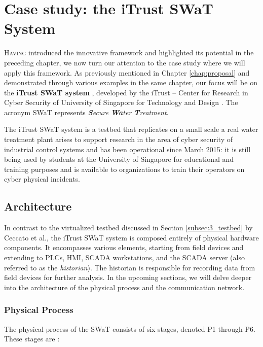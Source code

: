 \chapter{Case study: the iTrust SWaT System}
\label{casestudy}

\linenumbers
\lettrine[lines=2]{H}{aving} introduced the innovative framework and highlighted its potential in the preceding chapter, we now turn our attention to the case study where we will apply this framework. As previously mentioned in Chapter \ref{chap:proposal} and demonstrated through various examples in the same chapter, our focus will be on the \textbf{iTrust SWaT system} \cite{swat_home}, developed by the iTrust -- Center for Research in Cyber Security of University of Singapore for Technology and Design \cite{itrust_site}. The acronym SWaT represents \textit{\textbf{S}ecure \textbf{Wa}ter \textbf{T}reatment}.

\bigskip
The iTrust SWaT system is a testbed that replicates on a small scale a real water treatment plant arises to support research in the area of cyber security of industrial control systems and has been operational since March 2015: it is still being used by students at the University of Singapore for educational and training purposes and is available to organizations to train their operators on cyber physical incidents.

\section{Architecture}
\label{sec:5_swat_architecture}
In contrast to the virtualized testbed discussed in Section \ref{subsec:3_testbed} by Ceccato et al., the iTrust SWaT system is composed entirely of physical hardware components. It encompasses various elements, starting from field devices and extending to PLCs, HMI, SCADA workstations, and the SCADA server (also referred to as the \textit{historian}). The historian is responsible for recording data from field devices for further analysis. In the upcoming sections, we will delve deeper into the architecture of the physical process and the communication network.

\subsection{Physical Process} 
\label{subsec:5_swat_physical_architecture}
The physical process of the SWaT consists of six stages, denoted P1 through P6. These stages are \cite{swat_tecnical_pdf}\cite{swat_tippenhauer}:

